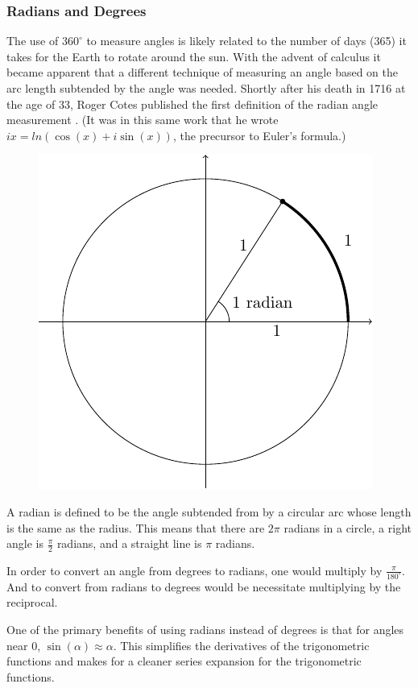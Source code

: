 \documentclass[
]{book}
\theoremstyle{definition}
\theoremstyle{definition}
\theoremstyle{definition}
\theoremstyle{definition}
\theoremstyle{remark}
\begin{document}
\hypertarget{radians-and-degrees}{%
\subsubsection{Radians and Degrees}\label{radians-and-degrees}}

The use of \(360^\circ\) to measure angles is likely related to the number of days (365) it takes for the Earth to rotate around the sun. With the advent of calculus it became apparent that a different technique of measuring an angle based on the arc length subtended by the angle was needed. Shortly after his death in 1716 at the age of 33, Roger Cotes published the first definition of the radian angle measurement \citeyearpar{Cotes}. (It was in this same work that he wrote \(ix=ln(\cos(x) + i\sin(x))\), the precursor to Euler's formula.)

\begin{figure}

{\centering \includegraphics[width=0.5\linewidth]{tikz/radian} 

}

\end{figure}

A radian is defined to be the angle subtended from by a circular arc whose length is the same as the radius. This means that there are \(2\pi\) radians in a circle, a right angle is \(\frac{\pi}{2}\) radians, and a straight line is \(\pi\) radians.

In order to convert an angle from degrees to radians, one would multiply by \(\frac{\pi}{180^\circ}\). And to convert from radians to degrees would be necessitate multiplying by the reciprocal.

One of the primary benefits of using radians instead of degrees is that for angles near \(0\), \(\sin(\alpha) \approx \alpha\). This simplifies the derivatives of the trigonometric functions and makes for a cleaner series expansion for the trigonometric functions.
\end{document}
